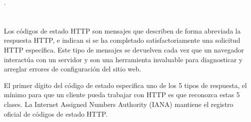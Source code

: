 \documentclass[10pt,a4paper]{article} %
\begin{document}
\begin{titlepage}
	\centering
	{ \huge \bfseries \color{colorIPN}{Instituto Politécnico Nacional} \par}
	{ \Large \bfseries  {} \par }
	\vspace{1cm}%
	{\huge\Large \color{colorIPN}{Web App Development}.\par}
	\vspace{1.5cm}
	{\huge\Large  {}\par}
		\vspace{2cm}
	{\Large\itshape {}\par} \hfill \break
	\vspace{2cm}
	{\Large\itshape {}\par} \hfill \break
	{\Large\itshape \color{colorIPN}{mauro\_luigi@hotmail.com}\par} \hfill \break
	{\Large\itshape \color{colorIPN}{3CM18} \par}
	\vfill
	{\large \color{colorIPN}{\today}\par} 
	\vfill
\end{titlepage}

\renewcommand\lstlistingname{Quelltext} 

\tableofcontents 
\pagebreak


\pagebreak

\section{}%
{\large Los c{\'o}digos de estado HTTP son mensajes que describen de forma abreviada la respuesta HTTP, e indican si se ha completado satisfactoriamente una solicitud HTTP espec{\'i}fica. Este tipo de mensajes se devuelven cada vez que un navegador interact{\'u}a con un servidor y son una herramienta invaluable para diagnosticar y arreglar errores de configuraci{\'o}n del sitio web.


\vspace{0.5cm}
El primer d{\'i}gito del c{\'o}digo de estado especifica uno de los 5 tipos de respuesta, el m{\'i}nimo para que un cliente pueda trabajar con HTTP es que reconozca estas 5 clases. La Internet Assigned Numbers Authority (IANA) mantiene el registro oficial de c{\'o}digos de estado HTTP.}
\end{document}
